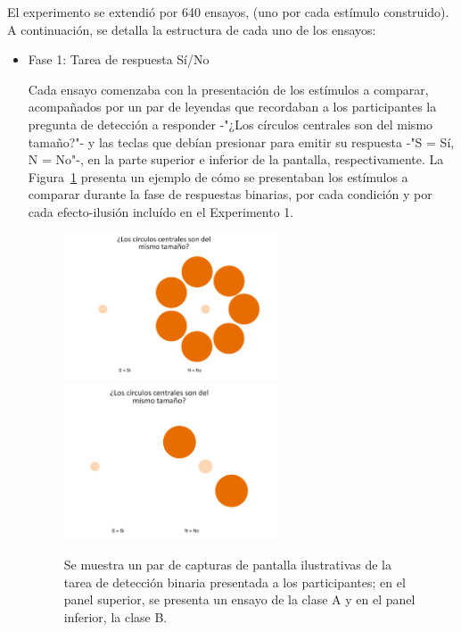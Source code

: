 \begin{itemize}
El experimento se extendió por 640 ensayos, (uno por cada estímulo construido). A continuación, se detalla la estructura de cada uno de los ensayos:\\

\begin{itemize}
\item Fase 1: Tarea de respuesta Sí/No

Cada ensayo comenzaba con la presentación de los estímulos a comparar, acompañados por un par de leyendas que recordaban a los participantes la pregunta de detección a responder -"¿Los círculos centrales son del mismo tamaño?"- y las teclas que debían presionar para emitir su respuesta -"S = Sí, N = No"-, en la parte superior e inferior de la pantalla, respectivamente. La Figura~\ref{fig:Ejem_YN} presenta un ejemplo de cómo se presentaban los estímulos a comparar durante la fase de respuestas binarias, por cada condición y por cada efecto-ilusión incluído en el Experimento 1.\\

\begin{figure}[th]
\centering
\includegraphics[width=0.60\textwidth]{Figures/Ejemplo_EnsayoYN_1}\\
\includegraphics[width=0.60\textwidth]{Figures/Ejemplo_EnsayoYN_2}
\caption[Presentación de ensayos con tarea de detección binaria]{Se muestra un par de capturas de pantalla ilustrativas de la tarea de detección binaria presentada a los participantes; en el panel superior, se presenta un ensayo de la clase A y en el panel inferior, la clase B.}
\label{fig:Ejem_YN}
\end{figure}


\end{itemize}
\end{itemize}

